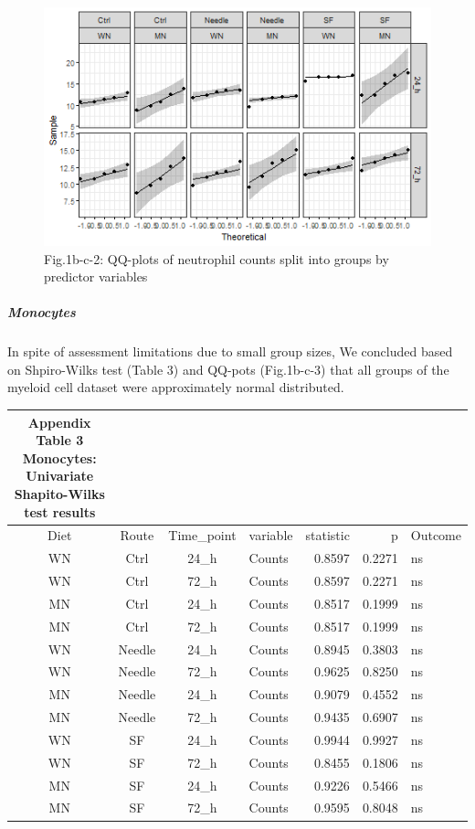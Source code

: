 \documentclass[
  12pt,
  letterpaper,
]{article}
\begin{document}
\begin{figure}[H]

{\centering \includegraphics[width=0.95\linewidth,]{Statistics_report_files/figure-latex/qq-plot-figure-1b-c-neutrophils-1} 

}

\caption{Fig.1b-c-2: QQ-plots of neutrophil counts split into groups by predictor variables}\label{fig:qq-plot-figure-1b-c-neutrophils}
\end{figure}

\subparagraph{Monocytes}\label{monocytes}

In spite of assessment limitations due to small group sizes, We concluded based on Shpiro-Wilks test (Table 3) and QQ-pots (Fig.1b-c-3) that all groups of the myeloid cell dataset were approximately normal distributed.

\begin{longtable}{ccclrrl}
\caption*{
{\large \textbf{Appendix Table 3}} \\ 
{\small \textbf{Monocytes: Univariate Shapito-Wilks test results}}
} \\ 
\toprule
Diet & Route & Time\_point & variable & statistic & p & Outcome \\ 
\midrule\addlinespace[2.5pt]
WN & Ctrl & 24\_h & Counts & 0.8597 & 0.2271 & ns \\ 
WN & Ctrl & 72\_h & Counts & 0.8597 & 0.2271 & ns \\ 
MN & Ctrl & 24\_h & Counts & 0.8517 & 0.1999 & ns \\ 
MN & Ctrl & 72\_h & Counts & 0.8517 & 0.1999 & ns \\ 
WN & Needle & 24\_h & Counts & 0.8945 & 0.3803 & ns \\ 
WN & Needle & 72\_h & Counts & 0.9625 & 0.8250 & ns \\ 
MN & Needle & 24\_h & Counts & 0.9079 & 0.4552 & ns \\ 
MN & Needle & 72\_h & Counts & 0.9435 & 0.6907 & ns \\ 
WN & SF & 24\_h & Counts & 0.9944 & 0.9927 & ns \\ 
WN & SF & 72\_h & Counts & 0.8455 & 0.1806 & ns \\ 
MN & SF & 24\_h & Counts & 0.9226 & 0.5466 & ns \\ 
MN & SF & 72\_h & Counts & 0.9595 & 0.8048 & ns \\ 
\bottomrule
\end{longtable}
\end{document}
